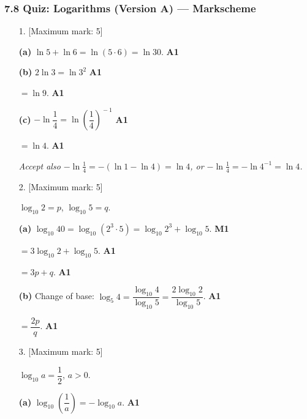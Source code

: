 \documentclass[12pt, twoside]{article}
\begin{document}
\subsubsection*{7.8 Quiz: Logarithms (Version A) --- Markscheme}

\begin{enumerate}[itemsep=0.3cm]

\item[1.] [Maximum mark: 5]

\textbf{(a)} $\ln 5 + \ln 6 = \ln(5 \cdot 6) = \ln 30$. \hfill \textbf{A1}

\medskip

\textbf{(b)} $2\ln 3 = \ln 3^{2}$ \hfill \textbf{A1}

$= \ln 9$. \hfill \textbf{A1}

\medskip

\textbf{(c)} $-\ln\dfrac{1}{4} = \ln\!\left(\dfrac{1}{4}\right)^{\!-1}$
\hfill \textbf{A1}

$= \ln 4$. \hfill \textbf{A1}

\emph{Accept also $-\ln\tfrac{1}{4} = -(\ln 1 - \ln 4) = \ln 4$, or
$-\ln\tfrac{1}{4} = -\ln 4^{-1} = \ln 4$.}

\medskip

\item[2.] [Maximum mark: 5]

$\log_{10} 2 = p$, $\log_{10} 5 = q$.

\medskip

\textbf{(a)} $\log_{10} 40 = \log_{10}(2^{3} \cdot 5)
= \log_{10} 2^{3} + \log_{10} 5$. \hfill \textbf{M1}

$= 3\log_{10} 2 + \log_{10} 5$. \hfill \textbf{A1}

$= 3p + q$. \hfill \textbf{A1}

\medskip

\textbf{(b)} Change of base:
$\log_{5} 4 = \dfrac{\log_{10} 4}{\log_{10} 5}
= \dfrac{2\log_{10} 2}{\log_{10} 5}$. \hfill \textbf{A1}

$= \dfrac{2p}{q}$. \hfill \textbf{A1}

\newpage

\item[3.] [Maximum mark: 5]

$\log_{10} a = \dfrac{1}{2}$, $a > 0$.

\medskip

\textbf{(a)} $\log_{10}\!\left(\dfrac{1}{a}\right) = -\log_{10} a$.
\hfill \textbf{A1}


\end{enumerate}
\end{document}
